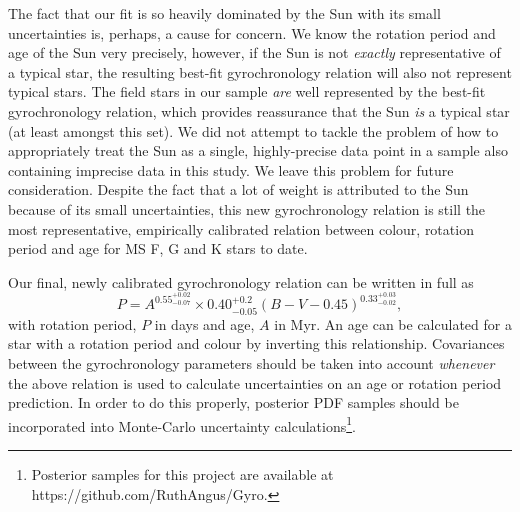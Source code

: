 \documentclass[useAMS, usenatbib]{mn2e}
\newcommand{\logg}{log \emph{g}}
\newcommand{\subcut}{4.2~}
\newcommand{\gyroa}{0.40}
\newcommand{\aerrp}{0.2}
\newcommand{\aerrm}{0.05}
\newcommand{\gyron}{0.55}
\newcommand{\nerrp}{0.02}
\newcommand{\nerrm}{0.07}
\newcommand{\gyrob}{0.33}
\newcommand{\berrp}{0.03}
\newcommand{\berrm}{0.02}
\begin{document}
The fact that our fit is so heavily dominated by the Sun with its small
uncertainties is, perhaps, a cause for concern.
We know the rotation period and age of the Sun very precisely, however, if the
Sun is not \emph{exactly} representative of a typical star, the resulting
best-fit gyrochronology relation will also not represent typical stars.
The field stars in our sample \emph{are} well represented by the best-fit
gyrochronology relation, which provides reassurance that the Sun \emph{is}
a typical star (at least amongst this set).
We did not attempt to tackle the problem of how to appropriately treat the Sun
as a single, highly-precise data point in a sample also containing imprecise
data in this study.
We leave this problem for future consideration.
Despite the fact that a lot of weight is attributed to the Sun because of its
small uncertainties, this new gyrochronology relation is still the most
representative, empirically calibrated relation between colour, rotation period
and age for MS F, G and K stars to date. %

Our final, newly calibrated gyrochronology relation can be written in full as
\begin{equation}
	P = A^{\gyron^{+\nerrp}_{-\nerrm}} \times \gyroa^{+\aerrp}_{-\aerrm}
	(B-V-0.45)^{\gyrob^{+\berrp}_{-\berrm}},
\label{eq:Barnes2007_3}
\end{equation}
with rotation period, $P$ in days and age, $A$ in Myr.
An age can be calculated for a star with a rotation period and colour by
inverting this relationship.
Covariances between the gyrochronology parameters should
be taken into account {\it whenever} the above relation is used to calculate
uncertainties on an age or rotation period prediction.
In order to do this properly, posterior PDF samples should be incorporated
into Monte-Carlo uncertainty calculations\footnote{Posterior samples for
this project are available at https://github.com/RuthAngus/Gyro.}.
\end{document}
